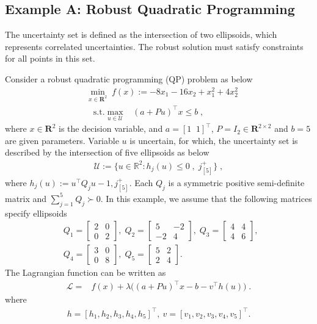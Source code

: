 \documentclass[journal,twoside,web]{ieeecolor}
\newcommand{\rev}[1]{#1}
\begin{document}
\subsection*{Example A: Robust Quadratic Programming}

The uncertainty set is defined as the intersection of two ellipsoids, which represents correlated uncertainties. The robust solution must satisfy constraints for all points in this set.

Consider a robust quadratic programming (QP) problem as below
\begin{align} \label{ro_simulation}
&\min_{x \in \mathbf{R}^2} \;f(x):=-8x_1-16x_2+x_1^2+4x_2^2\nonumber\\
&\;\;\;\text{s.t.} \max_{u\in \mathcal{U}} \;\;\; (a+Pu)^\top x\leq b\;,
\end{align}
where $x \in \mathbf{R}^2$ is the decision variable, and $a =[1\;\;1]^\top$, $P=I_2 \in \mathbf{R}^{2 \times 2}$ and $b=5$ are given parameters. Variable $u$ is uncertain, for which, the uncertainty set is described by the intersection of five ellipsoids as below
\begin{align*}\mathcal{U}:=\{u \in \mathbb{R}^{2}:h_{j}(u) \leq 0\;,\; j^+_{[5]}\}\;,\end{align*}
where
$h_j(u):=u^\top Q_j u-1, j^+_{[5]}$. Each $Q_{j}$ is a symmetric positive semi-definite matrix and $ \sum_{j=1}^{5} Q_j \succ 0$. In this example, we assume that the following matrices specify ellipsoids
\begin{align*}
&Q_1=\left[\begin{array}{ccl} 2 & 0\\0 & 2 \end{array}\right],\; Q_2=\left[\begin{array}{ccl} 5 & -2\\-2 & 4  \end{array}\right],\; Q_3=\left[\begin{array}{ccl} 4 & 4\\4 & 6\end{array}\right],\;\\
&Q_4=\left[\begin{array}{ccl} 3 & 0\\0 & 8 \end{array}\right],\;
Q_5=\left[\begin{array}{ccl} 5 & 2\\2 & 4 \end{array}\right].
\end{align*}
The Lagrangian function can be written as
\begin{align*}
\mathcal{L}=&f(x)+\lambda \big((a+Pu)^\top x-b-v ^\top h(u)\big)\;.
\end{align*}
where
\begin{align*}
\rev{h=[h_1,h_2,h_3,h_4,h_5]^\top} ,\ v=[v_1,v_2,v_3,v_4,v_5]^\top.
\end{align*}
\end{document}
